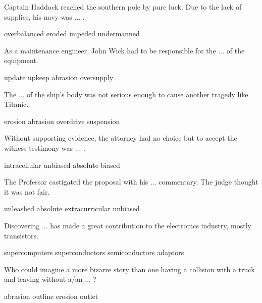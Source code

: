 \documentclass{exam}
\begin{document}
\begin{questions}
\question Captain Haddock reached the southern pole by pure luck. Due to the lack of supplies, his navy was ... .\\
\begin{oneparchoices}
\choice overbalanced 
 \choice eroded
 \choice impeded 
 \correctchoice undermanned
\end{oneparchoices}

\question As a maintenance engineer, John Wick had to be responsible for the ... of the equipment.\\
\begin{oneparchoices}
\choice update 
\correctchoice upkeep
 \choice abrasion 
 \choice oversupply 
\end{oneparchoices}

\question The ... of the ship's body was not serious enough to cause another tragedy like Titanic.\\
\begin{oneparchoices} 
\correctchoice erosion
 \choice abrasion 
 \choice overdrive
 \choice suspension
\end{oneparchoices}

\question Without supporting evidence, the attorney had no choice but to accept the witness testimony was ... .
\\
\begin{oneparchoices} 
\choice intracellular
 \choice unbiased
\correctchoice absolute
 \choice biased 
\end{oneparchoices}

\question The Professor castigated the proposal with his ... commentary. The judge thought it was not fair.\\
\begin{oneparchoices} 
\choice unleashed
\choice absolute
\choice extracurricular
\correctchoice unbiased
\end{oneparchoices}



\question Discovering ... has made a great contribution to the electronics industry, mostly transistors.\\
\begin{oneparchoices} 
\choice supercomputers
\choice superconductors
\correctchoice semiconductors
\choice adaptors
\end{oneparchoices}

\question Who could imagine a more bizarre story than one having a collision with a truck and leaving without a/an ... ?\\
\begin{oneparchoices} 
\correctchoice abrasion
\choice outline
\choice erosion
\choice outlet 
\end{oneparchoices}


\end{questions}
\end{document}
